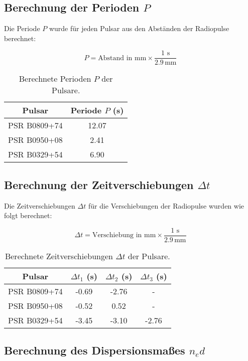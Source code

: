 \documentclass[a4paper,12pt]{article}
\begin{document}
\subsection*{Berechnung der Perioden \(P\)}

Die Periode \(P\) wurde für jeden Pulsar aus den Abständen der Radiopulse berechnet:

\[
P = \text{Abstand in mm} \times \frac{\text{1 s}}{2.9 \, \text{mm}}
\]

\begin{table}[H]
\centering
\begin{tabular}{|c|c|}
\hline
Pulsar         & Periode \(P\) (s) \\ \hline
PSR B0809+74   & 12.07             \\ \hline
PSR B0950+08   & 2.41              \\ \hline
PSR B0329+54   & 6.90              \\ \hline
\end{tabular}
\caption{Berechnete Perioden \(P\) der Pulsare.}
\end{table}

\subsection*{Berechnung der Zeitverschiebungen \(\Delta t\)}

Die Zeitverschiebungen \(\Delta t\) für die Verschiebungen der Radiopulse wurden wie folgt berechnet:

\[
\Delta t = \text{Verschiebung in mm} \times \frac{\text{1 s}}{2.9 \, \text{mm}}
\]

\begin{table}[H]
\centering
\begin{tabular}{|c|c|c|c|}
\hline
Pulsar         & \(\Delta t_{1}\) (s) & \(\Delta t_{2}\) (s) & \(\Delta t_{3}\) (s) \\ \hline
PSR B0809+74   & -0.69                & -2.76                & -                    \\ \hline
PSR B0950+08   & -0.52                & 0.52                 & -                    \\ \hline
PSR B0329+54   & -3.45                & -3.10                & -2.76                \\ \hline
\end{tabular}
\caption{Berechnete Zeitverschiebungen \(\Delta t\) der Pulsare.}
\end{table}

\subsection*{Berechnung des Dispersionsmaßes \(n_e d\)}
\end{document}
